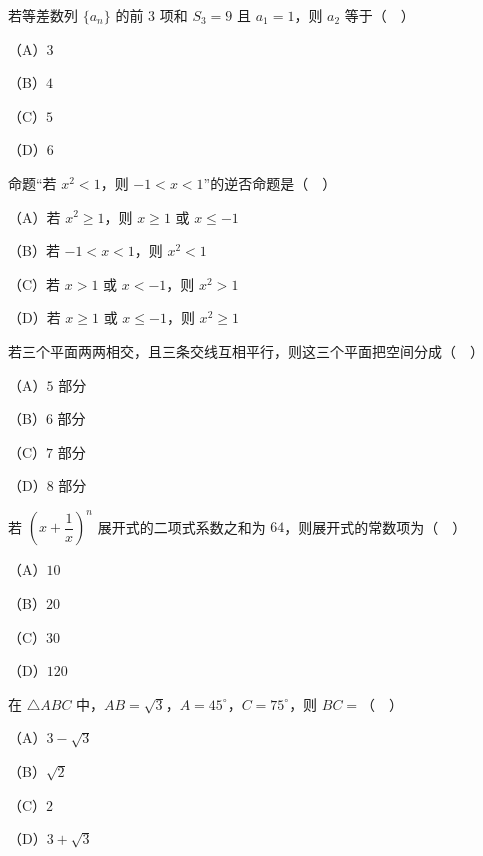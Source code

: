 


\begin{question}
若等差数列 $\{a_n\}$ 的前 $3$ 项和 $S_3=9$ 且 $a_1=1$，则 $a_2$ 等于（　）

（A）$3$

（B）$4$

（C）$5$

（D）$6$

\end{question}
\begin{question}
命题“若 $x^2<1$，则 $-1<x<1$”的逆否命题是（　）

（A）若 $x^2\geqslant1$，则 $x\geqslant1$ 或 $x\leqslant-1$

（B）若 $-1<x<1$，则 $x^2<1$

（C）若 $x>1$ 或 $x<-1$，则 $x^2>1$

（D）若 $x\geqslant1$ 或 $x\leqslant-1$，则 $x^2\geqslant1$

\end{question}
\begin{question}
若三个平面两两相交，且三条交线互相平行，则这三个平面把空间分成（　）

（A）$5$ 部分

（B）$6$ 部分

（C）$7$ 部分

（D）$8$ 部分

\end{question}
\begin{question}
若 $\left(x+\dfrac1x\right)^n$ 展开式的二项式系数之和为 $64$，则展开式的常数项为（　）

（A）$10$

（B）$20$

（C）$30$

（D）$120$

\end{question}
\begin{question}
在 $\triangle ABC$ 中，$AB=\sqrt3$，$A=45^\circ$，$C=75^\circ$，则 $BC=$（　）

（A）$3-\sqrt3$

（B）$\sqrt2$

（C）$2$

（D）$3+\sqrt3$

\end{question}
